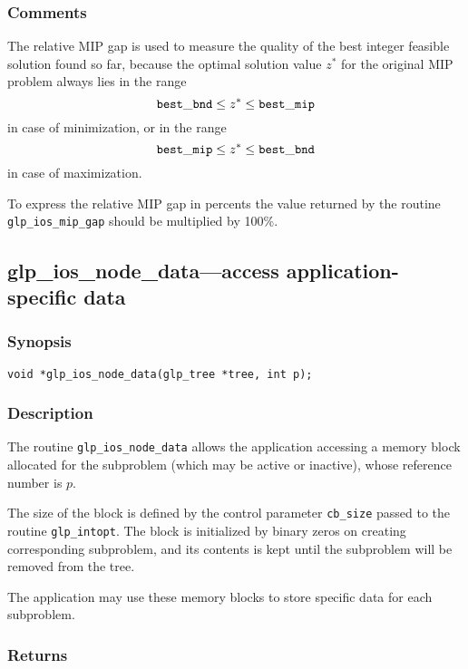 \subsubsection*{Comments}

The relative MIP gap is used to measure the quality of the best integer
feasible solution found so far, because the optimal solution value
$z^*$ for the original MIP problem always lies in the range
$${\tt best\_bnd}\leq z^*\leq{\tt best\_mip}$$
in case of minimization, or in the range
$${\tt best\_mip}\leq z^*\leq{\tt best\_bnd}$$
in case of maximization.

To express the relative MIP gap in percents the value returned by the
routine \verb|glp_ios_mip_gap| should be multiplied by 100\%.

\newpage

\subsection{glp\_ios\_node\_data---access application-specific data}

\subsubsection*{Synopsis}

\begin{verbatim}
void *glp_ios_node_data(glp_tree *tree, int p);
\end{verbatim}

\subsubsection*{Description}

The routine \verb|glp_ios_node_data| allows the application accessing a
memory block allocated for the subproblem (which may be active or
inactive), whose reference number is $p$.

The size of the block is defined by the control parameter \verb|cb_size|
passed to the routine \verb|glp_intopt|. The block is initialized by
binary zeros on creating corresponding subproblem, and its contents is
kept until the subproblem will be removed from the tree.

The application may use these memory blocks to store specific data for
each subproblem.

\subsubsection*{Returns}

